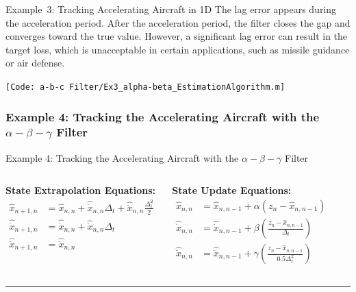 \begin{frame}{Example~3: Tracking Accelerating Aircraft in 1D}
The lag error appears during the acceleration period. After the acceleration period, the filter closes the gap and converges toward the true value. However, a significant lag error can result in the target loss, which is unacceptable in certain applications, such as missile guidance or air defense.

\texttt{\tiny [Code: a-b-c Filter/Ex3\_alpha-beta\_EstimationAlgorithm.m]}
\end{frame}
\subsubsection{Example 4: Tracking the Accelerating Aircraft with the $\alpha-\beta-\gamma$ Filter}
\begin{frame}{Example 4: Tracking the Accelerating Aircraft with the $\alpha-\beta-\gamma$ Filter}
\begin{columns}
    \vspace{-20pt}
    \begin{center}
    \begin{minipage}{1\linewidth} %
    \begin{exampleblock}{\textbf{State Extrapolation Equations:}}
        \begin{align*}
            \hat{x}_{n+1,n} & = \hat{x}_{n,n} + \hat{\dot{x}}_{n,n}\Delta_t + \hat{\ddot{x}}_{n,n}\frac{\Delta_t^2}{2}\\
            \hat{\dot{x}}_{n+1,n} & = \hat{\dot{x}}_{n,n} + \hat{\ddot{x}}_{n,n}\Delta_t\\
            \hat{\ddot{x}}_{n+1,n} & = \hat{\ddot{x}}_{n,n}
        \end{align*}
    \end{exampleblock}
    \end{minipage}
\end{center}
    
    \vspace{-20pt}
    \begin{center}
    \begin{minipage}{1\linewidth} %
    \begin{exampleblock}{\textbf{State Update Equations:}}
    \begin{align*}
        \hat{x}_{n,n} & = \hat{x}_{n,n-1} + \alpha (z_n - \hat{x}_{n,n-1})\\
        \hat{\dot{x}}_{n,n} & = \hat{\dot{x}}_{n,n-1} + \beta\left(\frac{z_n - \hat{x}_{n,n-1}}{\Delta_t}\right)\\
        \hat{\ddot{x}}_{n,n} & = \hat{\ddot{x}}_{n,n-1} + \gamma\left(\frac{z_n - \hat{x}_{n,n-1}}{0.5\Delta_t^2}\right)
    \end{align*}
        \end{exampleblock}
    \end{minipage}
\end{center}
\end{columns}
\noindent\rule{5cm}{0.4pt}


\end{frame}
